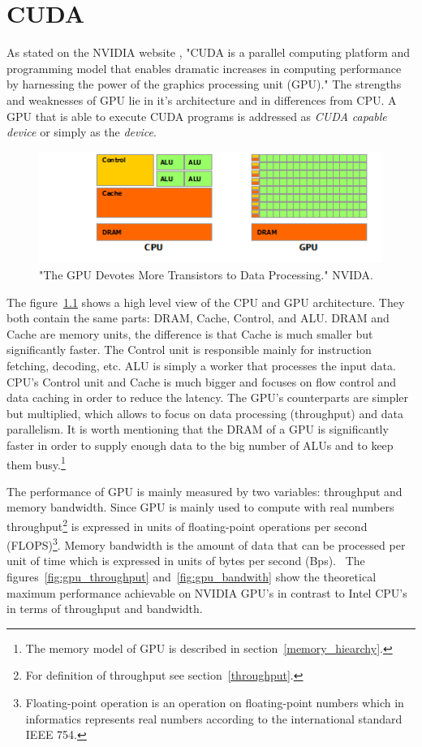 \documentclass[12pt,twoside]{fithesis2}
\begin{document}
\chapter{CUDA}
As stated on the NVIDIA website \cite{about_cuda}, "CUDA is a parallel computing platform and programming model that enables dramatic increases in computing performance by harnessing the power of the graphics processing unit (GPU)." The strengths and weaknesses of GPU lie in it's architecture and in differences from CPU. A GPU that is able to execute CUDA programs is addressed as \emph{CUDA capable device} or simply as the \emph{device}.

\begin{figure}[H]
	\centering
	\includegraphics{figures/gpu-devotes-more-transistors-to-data-processing.png}
	\caption{"The GPU Devotes More Transistors to Data Processing." NVIDA. \cite{cuda_guide}}
	\label{fig:cpu_vs_gpu_arch}
\end{figure}

The figure~\ref{fig:cpu_vs_gpu_arch} shows a high level view of the CPU and GPU architecture. They both contain the same parts: DRAM, Cache, Control, and ALU. DRAM and Cache are memory units, the difference is that Cache is much smaller but significantly faster. The Control unit is responsible mainly for instruction fetching, decoding, etc. ALU is simply a worker that processes the input data. CPU's Control unit and Cache is much bigger and focuses on flow control and data caching in order to reduce the latency. The GPU's counterparts are simpler but multiplied, which allows to focus on data processing (throughput) and data parallelism. It is worth mentioning that the DRAM of a GPU is significantly faster in order to supply enough data to the big number of ALUs and to keep them busy.\footnote{The memory model of GPU is described in section~\ref{memory_hiearchy}.}

The performance of GPU is mainly measured by two variables: throughput and memory bandwidth. Since GPU is mainly used to compute with real numbers throughput\footnote{For definition of throughput see section~\ref{throughput}.} is expressed in units of floating-point operations per second (FLOPS)\footnote{Floating-point operation is an operation on floating-point numbers which in informatics represents real numbers according to the international standard IEEE 754.}. Memory bandwidth is the amount of data that can be processed per unit of time which is expressed in units of bytes per second (Bps).~\cite{professional_cuda} The figures~\ref{fig:gpu_throughput} and~\ref{fig:gpu_bandwith} show the theoretical maximum performance achievable on NVIDIA GPU's in contrast to Intel CPU's in terms of throughput and bandwidth.
\end{document}
